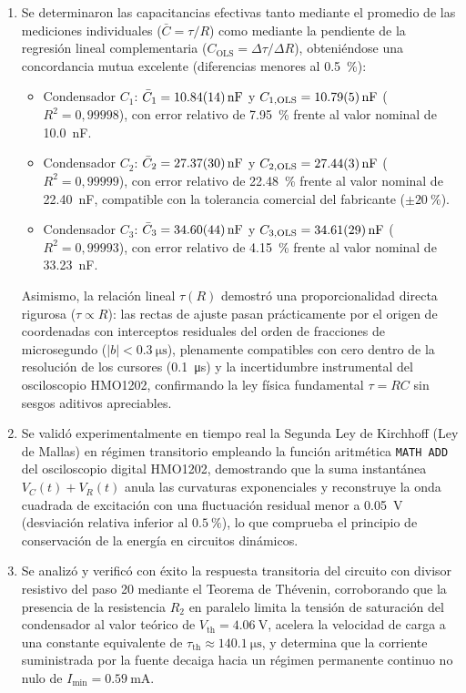 \begin{enumerate}
    \item Se determinaron las capacitancias efectivas tanto mediante el promedio de las mediciones individuales ($\bar{C} = \tau / R$) como mediante la pendiente de la regresión lineal complementaria ($C_{\text{OLS}} = \Delta \tau / \Delta R$), obteniéndose una concordancia mutua excelente (diferencias menores al \qty{0,5}{\percent}):
    \begin{itemize}
        \item Condensador $C_1$: $\bar{C}_1 = \qty{10,84 \pm 0,14}{\nano\farad}$ y $C_{1,\text{OLS}} = \qty{10,79 \pm 0,05}{\nano\farad}$ ($R^2 = 0{,}99998$), con error relativo de \qty{+7,95}{\percent} frente al valor nominal de \qty{10,0}{\nano\farad}.
        \item Condensador $C_2$: $\bar{C}_2 = \qty{27,37 \pm 0,30}{\nano\farad}$ y $C_{2,\text{OLS}} = \qty{27,44 \pm 0,03}{\nano\farad}$ ($R^2 = 0{,}99999$), con error relativo de \qty{+22,48}{\percent} frente al valor nominal de \qty{22,40}{\nano\farad}, compatible con la tolerancia comercial del fabricante ($\pm\qty{20}{\percent}$).
        \item Condensador $C_3$: $\bar{C}_3 = \qty{34,60 \pm 0,44}{\nano\farad}$ y $C_{3,\text{OLS}} = \qty{34,61 \pm 0,29}{\nano\farad}$ ($R^2 = 0{,}99993$), con error relativo de \qty{+4,15}{\percent} frente al valor nominal de \qty{33,23}{\nano\farad}.
    \end{itemize}
    Asimismo, la relación lineal $\tau(R)$ demostró una proporcionalidad directa rigurosa ($\tau \propto R$): las rectas de ajuste pasan prácticamente por el origen de coordenadas con interceptos residuales del orden de fracciones de microsegundo ($|b| < \qty{0,3}{\micro\second}$), plenamente compatibles con cero dentro de la resolución de los cursores (\qty{0,1}{\micro\second}) y la incertidumbre instrumental del osciloscopio HMO1202, confirmando la ley física fundamental $\tau = RC$ sin sesgos aditivos apreciables.
    
    \item Se validó experimentalmente en tiempo real la Segunda Ley de Kirchhoff (Ley de Mallas) en régimen transitorio empleando la función aritmética \texttt{MATH ADD} del osciloscopio digital HMO1202, demostrando que la suma instantánea $V_C(t) + V_R(t)$ anula las curvaturas exponenciales y reconstruye la onda cuadrada de excitación con una fluctuación residual menor a \qty{0,05}{\volt} (desviación relativa inferior al $\qty{0,5}{\percent}$), lo que comprueba el principio de conservación de la energía en circuitos dinámicos.
    
    \item Se analizó y verificó con éxito la respuesta transitoria del circuito con divisor resistivo del paso 20 mediante el Teorema de Thévenin, corroborando que la presencia de la resistencia $R_2$ en paralelo limita la tensión de saturación del condensador al valor teórico de $V_{\text{th}} = \qty{4,06}{\volt}$, acelera la velocidad de carga a una constante equivalente de $\tau_{\text{th}} \approx \qty{140,1}{\micro\second}$, y determina que la corriente suministrada por la fuente decaiga hacia un régimen permanente continuo no nulo de $I_{\min} = \qty{0,59}{\milli\ampere}$.
\end{enumerate}
